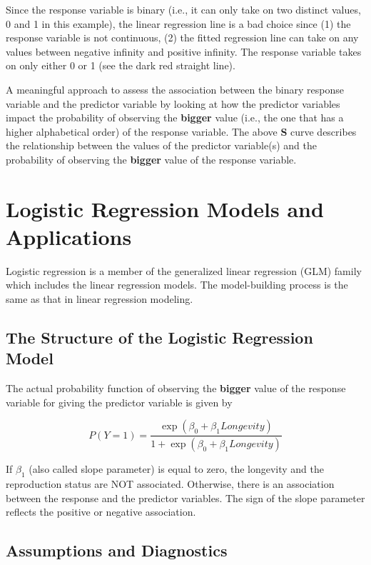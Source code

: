 \documentclass[
]{book}
\begin{document}
Since the response variable is binary (i.e., it can only take on two distinct values, 0 and 1 in this example), the linear regression line is a bad choice since (1) the response variable is not continuous, (2) the fitted regression line can take on any values between negative infinity and positive infinity. The response variable takes on only either 0 or 1 (see the dark red straight line).

A meaningful approach to assess the association between the binary response variable and the predictor variable by looking at how the predictor variables impact the probability of observing the \textbf{bigger} value (i.e., the one that has a higher alphabetical order) of the response variable. The above \textbf{S} curve describes the relationship between the values of the predictor variable(s) and the probability of observing the \textbf{bigger} value of the response variable.

\hypertarget{logistic-regression-models-and-applications}{%
\section{Logistic Regression Models and Applications}\label{logistic-regression-models-and-applications}}

Logistic regression is a member of the generalized linear regression (GLM) family which includes the linear regression models. The model-building process is the same as that in linear regression modeling.

\hypertarget{the-structure-of-the-logistic-regression-model}{%
\subsection{The Structure of the Logistic Regression Model}\label{the-structure-of-the-logistic-regression-model}}

The actual probability function of observing the \textbf{bigger} value of the response variable for giving the predictor variable is given by

\[
P(Y=1) = \frac{\exp(\beta_0 + \beta_1 Longevity)}{1 + \exp(\beta_0 + \beta_1 Longevity)}
\]

If \(\beta_1\) (also called slope parameter) is equal to zero, the longevity and the reproduction status are NOT associated. Otherwise, there is an association between the response and the predictor variables. The sign of the slope parameter reflects the positive or negative association.

\hypertarget{assumptions-and-diagnostics}{%
\subsection{Assumptions and Diagnostics}\label{assumptions-and-diagnostics}}
\end{document}
